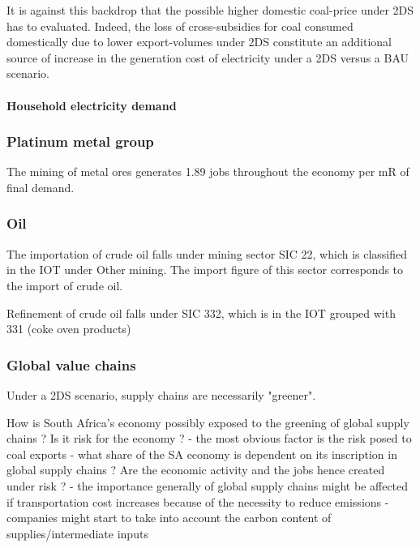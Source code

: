 \documentclass[12pt,english]{article}
\begin{document}

It is against this backdrop that the possible higher domestic coal-price under 2DS has to evaluated. Indeed, the loss of cross-subsidies for coal consumed domestically due to lower export-volumes under 2DS constitute an additional source of increase in the generation cost of electricity under a 2DS versus a BAU scenario.


\paragraph{Household electricity demand}



\subsubsection{Platinum metal group}

The mining of metal ores generates 1.89 jobs throughout the economy per mR of final demand. 

\subsubsection{Oil}

The importation of crude oil falls under mining sector SIC 22, which is classified in the IOT under Other mining. The import figure of this sector corresponds to the import of crude oil. 

Refinement of crude oil falls under SIC 332, which is in the IOT grouped with 331 (coke oven products) 

\subsubsection{Global value chains}

Under a 2DS scenario, supply chains are necessarily "greener". 

How is South Africa's economy possibly exposed to the greening of global supply chains ? Is it risk for the economy ?
- the most obvious factor is the risk posed to coal exports
- what share of the SA economy is dependent on its inscription in global supply chains ? Are the economic activity and the jobs hence created under risk ? 
- the importance generally of global supply chains might be affected if transportation cost increases because of the necessity to reduce emissions
- companies might start to take into account the carbon content of supplies/intermediate inputs
\end{document}
